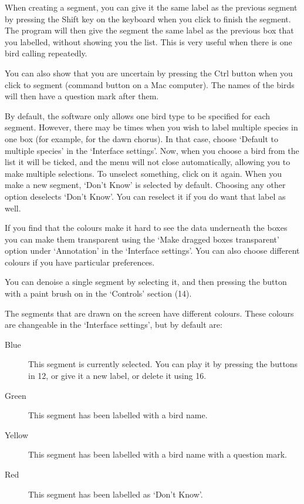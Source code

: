 \documentclass{article}
\begin{document}
When creating a segment, you can give it the same label as the previous segment by pressing the Shift key on the keyboard when you click to finish the segment. The program will then give the segment the same label as the previous box that you labelled, without showing you the list. This is very useful when there is one bird calling repeatedly.

You can also show that you are uncertain by pressing the Ctrl button when you click to segment (command button on a Mac computer). The names of the birds will then have a question mark after them.

By default, the software only allows one bird type to be specified for each segment. However, there may be times when you wish to label multiple species in one box (for example, for the dawn chorus). In that case, choose `Default to multiple species' in the `Interface settings'. Now, when you choose a bird from the list it will be ticked, and the menu will not close automatically, allowing you to make multiple selections. To unselect something, click on it again. When you make a new segment, `Don't Know' is selected by default. Choosing any other option deselects `Don't Know'. You can reselect it if you do want that label as well. 

If you find that the colours make it hard to see the data underneath the boxes you can make them transparent using the `Make dragged boxes transparent' option under `Annotation' in the `Interface settings'. You can also choose different colours if you have particular preferences.

You can denoise a single segment by selecting it, and then pressing the button with a paint brush on in the `Controls' section (14).


The segments that are drawn on the screen have different colours. These colours are changeable in the `Interface settings', but by default are:
	\begin{description} 
	\item[Blue] This segment is currently selected. You can play it by pressing the buttons in 12, or give it a new label, or delete it using 16. 
	\item[Green] This segment has been labelled with a bird name.
	\item[Yellow] This segment has been labelled with a bird name with a question mark.
	\item[Red] This segment has been labelled as `Don't Know'.
	\end{description}
\end{document}
